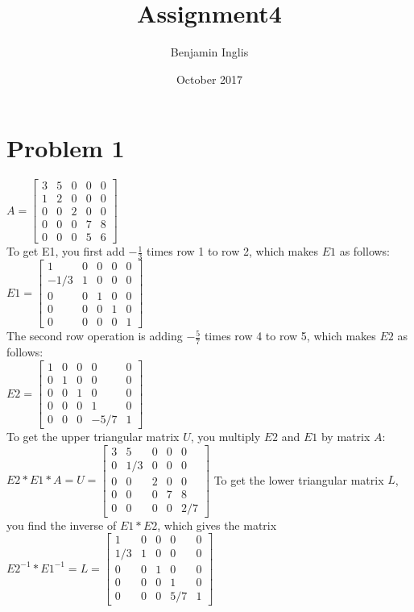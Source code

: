 \documentclass{article}
\title{Assignment4}
\author{Benjamin Inglis}
\date{October 2017}
\begin{document}
\maketitle
\tableofcontents
\clearpage
\section{Problem 1}
$ A = \begin{bmatrix}
3&5&0&0&0 \\
1&2&0&0&0 \\
0&0&2&0&0 \\
0&0&0&7&8 \\
0&0&0&5&6
\end{bmatrix}$\\ 
To get E1, you first add $-\frac{1}{3}$ times row 1 to row 2, which makes $E1$ as follows: 
$E1 = \begin{bmatrix}
1&0&0&0&0 \\
-1/3&1&0&0&0 \\
0&0&1&0&0 \\
0&0&0&1&0 \\
0&0&0&0&1
\end{bmatrix}$
\\ The second row operation is adding $-\frac{5}{7}$ times row 4 to row 5, which makes $E2$ as follows:\\
$E2 = \begin{bmatrix}
1&0&0&0&0 \\
0&1&0&0&0 \\
0&0&1&0&0 \\
0&0&0&1&0 \\
0&0&0&-5/7&1
\end{bmatrix}$\\
To get the upper triangular matrix $U$, you multiply $E2$ and $E1$ by matrix $A$:
$E2 * E1 * A = U = 
\begin{bmatrix}
3&5&0&0&0 \\
0&1/3&0&0&0 \\
0&0&2&0&0 \\
0&0&0&7&8 \\
0&0&0&0&2/7
\end{bmatrix}
$
To get the lower triangular matrix $L$, you find the inverse of $E1*E2$, which gives the matrix
$E2^{-1} * E1^{-1} = L = \begin{bmatrix}
1&0&0&0&0 \\
1/3&1&0&0&0 \\
0&0&1&0&0 \\
0&0&0&1&0 \\
0&0&0&5/7&1
\end{bmatrix}$
\end{document}
